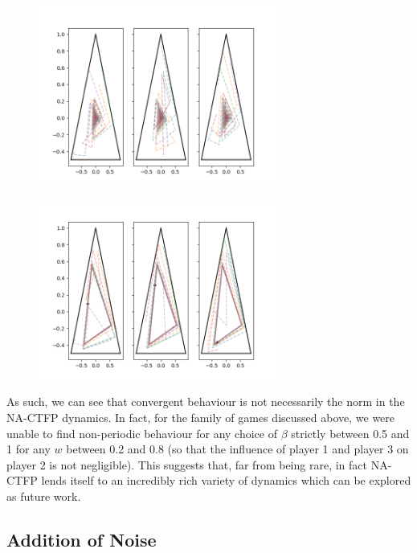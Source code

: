 \documentclass{article}
\theoremstyle{definition}
\begin{document}
	\begin{figure}[t]
		\centering
		\includegraphics[width = 0.7\textwidth]{Figures/convergentShapley.png}
		\caption{\label{fig::convergentShapley}}
	\end{figure}

	\begin{figure}[t]
		\centering
		\includegraphics[width = 0.7\textwidth]{Figures/nonconvergentShapley.png}
		\caption{\label{fig::nonconvergentShapley}}
	\end{figure}

	As such, we can see that convergent behaviour is not necessarily the norm in the NA-CTFP dynamics. In fact, for the family of games discussed above, we were unable to find non-periodic behaviour for any choice of $\beta$ strictly between 0.5 and 1 for any $w$ between 0.2 and 0.8 (so that the influence of player 1 and player 3 on player 2 is not negligible). This suggests that, far from being rare, in fact NA-CTFP lends itself to an incredibly rich variety of dynamics which can be explored as future work.
	

	\subsection{Addition of Noise}
\end{document}

